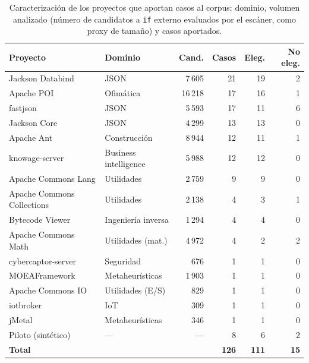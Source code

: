 \begin{table}[ht]
\centering
\footnotesize
\caption{Caracterización de los proyectos que aportan casos al corpus: dominio,
volumen analizado (número de candidatos a \texttt{if} externo evaluados por el
escáner, como proxy de tamaño) y casos aportados.}
\label{tab:corpus-proyectos}
\begin{tabular}{@{}llrrrr@{}}
\toprule
\textbf{Proyecto} & \textbf{Dominio} & \textbf{Cand.} & \textbf{Casos} & \textbf{Eleg.} & \textbf{No eleg.} \\
\midrule
Jackson Databind            & JSON                  & 7\,605  & 21 & 19 & 2 \\
Apache POI                  & Ofimática             & 16\,218 & 17 & 16 & 1 \\
fastjson                    & JSON                  & 5\,593  & 17 & 11 & 6 \\
Jackson Core                & JSON                  & 4\,299  & 13 & 13 & 0 \\
Apache Ant                  & Construcción          & 8\,944  & 12 & 11 & 1 \\
knowage-server              & Business intelligence & 5\,988  & 12 & 12 & 0 \\
Apache Commons Lang         & Utilidades            & 2\,759  &  9 &  9 & 0 \\
Apache Commons Collections  & Utilidades            & 2\,138  &  4 &  3 & 1 \\
Bytecode Viewer             & Ingeniería inversa    & 1\,294  &  4 &  4 & 0 \\
Apache Commons Math         & Utilidades (mat.)     & 4\,972  &  4 &  2 & 2 \\
cybercaptor-server          & Seguridad             &   676   &  1 &  1 & 0 \\
MOEAFramework               & Metaheurísticas       & 1\,903  &  1 &  1 & 0 \\
Apache Commons IO           & Utilidades (E/S)      &   829   &  1 &  1 & 0 \\
iotbroker                   & IoT                   &   309   &  1 &  1 & 0 \\
jMetal                      & Metaheurísticas       &   346   &  1 &  1 & 0 \\
\midrule
Piloto (sintético)          & ---                   & ---     &  8 &  6 & 2 \\
\midrule
\textbf{Total}              &                       &         & \textbf{126} & \textbf{111} & \textbf{15} \\
\bottomrule
\end{tabular}
\end{table}

